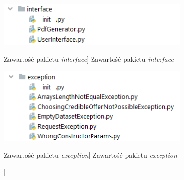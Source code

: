 \documentclass[../Kamil_Kowalewski_Main.tex]{subfiles}
\begin{document}
{{{            \begin{figure}[H]
                \centering
                \begin{minipage}[b]{0.45\textwidth}
                    \centering
                    \includegraphics[width=0.85\textwidth, keepaspectratio]
                    {img/chapter4/interface_package.png}
                    \caption
                    [Zawartość pakietu \textit{interface}]
                    {Zawartość pakietu \textit{interface}}
                    \label{fig:chapter4:srodowisko_eksperymentalne:inteface_package}
                \end{minipage}
                \hfill
                \begin{minipage}[b]{0.45\textwidth}
                    \centering
                    \includegraphics[width=0.85\textwidth, keepaspectratio]
                    {img/chapter4/exception_package.png}
                    \caption
                    [Zawartość pakietu \textit{exception}]
                    {Zawartość pakietu \textit{exception}}
                    \label{fig:chapter4:srodowisko_eksperymentalne:exception_package}
                \end{minipage}
            \end{figure}

}}}
\end{document}
